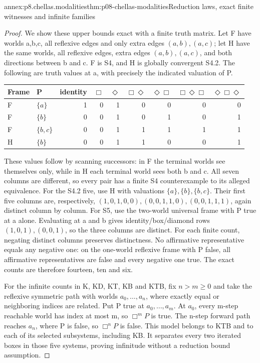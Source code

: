 \begin{annexitem}{annex:p8.chellas.modalities}{thm:p08-chellas-modalities}{Reduction laws, exact finite witnesses and infinite families}
\begin{proof}
We show these upper bounds exact with a finite truth matrix.
Let F have worlds a,b,c, all reflexive edges and only extra
edges \((a,b),(a,c)\); let H have the same worlds, all reflexive
edges, extra edges \((a,b),(a,c)\), and both directions between
b and c. F is S4, and H is globally convergent S4.2. The following
are truth values at a, with precisely the indicated valuation of P.
\begin{center}\small
\begin{tabular}{@{}llrrrrrrr@{}}
\toprule
Frame & P & identity & \(\Box\) & \(\Diamond\) &
 \(\Box\Diamond\) & \(\Diamond\Box\) &
 \(\Box\Diamond\Box\) & \(\Diamond\Box\Diamond\) \\
\midrule
F & \(\{a\}\) & 1&0&1&0&0&0&0 \\
F & \(\{b\}\) & 0&0&1&0&1&0&1 \\
F & \(\{b,c\}\) & 0&0&1&1&1&1&1 \\
H & \(\{b\}\) & 0&0&1&1&0&0&1 \\
\bottomrule
\end{tabular}
\end{center}
These values follow by scanning successors: in F the terminal
worlds see themselves only, while in H each terminal world sees
both b and c. All seven columns are different, so every pair
has a finite S4 counterexample to its alleged equivalence.
For the S4.2 five, use H with valuations
\(\{a\},\{b\},\{b,c\}\). Their first five columns are,
respectively,
\((1,0,1,0,0),(0,0,1,1,0),(0,0,1,1,1)\),
again distinct column by column. For S5, use the two-world
universal frame with P true at a alone. Evaluating at a and b
gives identity/box/diamond rows \((1,0,1),(0,0,1)\),
so the three columns are distinct. For each finite count,
negating distinct columns preserves distinctness. No affirmative
representative equals any negative one: on the one-world reflexive
frame with P false, all affirmative representatives are false
and every negative one true. The exact counts are therefore
fourteen, ten and six.

For the infinite counts in K, KD, KT, KB and KTB, fix \(n>m\geq0\)
and take the reflexive symmetric path with worlds
\(a_0,\ldots,a_n\), where exactly equal or neighboring indices
are related. Put P true at \(a_0,\ldots,a_m\).
At \(a_0\), every m-step reachable world has index at most m,
so \(\Box^m P\) is true. The n-step forward path reaches
\(a_n\), where P is false, so \(\Box^n P\) is false.
This model belongs to KTB and to each of its selected subsystems,
including KB. It separates every two iterated boxes in those five
systems, proving infinitude without a reduction bound assumption.


\end{proof}
\end{annexitem}
